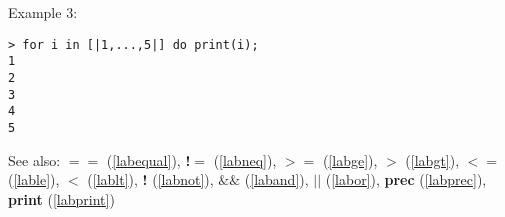 \noindent Example 3: 
\begin{center}\begin{minipage}{15cm}\begin{Verbatim}[frame=single]
> for i in [|1,...,5|] do print(i);
1
2
3
4
5
\end{Verbatim}
\end{minipage}\end{center}
See also: \textbf{$==$} (\ref{labequal}), \textbf{!$=$} (\ref{labneq}), \textbf{$>=$} (\ref{labge}), \textbf{$>$} (\ref{labgt}), \textbf{$<=$} (\ref{lable}), \textbf{$<$} (\ref{lablt}), \textbf{!} (\ref{labnot}), \textbf{$\&\&$} (\ref{laband}), \textbf{$||$} (\ref{labor}), \textbf{prec} (\ref{labprec}), \textbf{print} (\ref{labprint})
